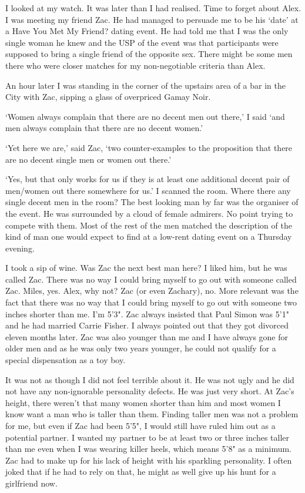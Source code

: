 I looked at my watch. It was later than I had realised. Time to
forget about Alex. I was meeting my friend Zac. He had managed to
persuade me to be his `date' at a Have You Met My Friend? dating
event. He had told me that
I was the only single woman he knew and the USP of the event was
that participants were supposed to bring a single friend of the
opposite sex. There might be some men there who were closer matches for my
non-negotiable criteria than Alex.

An hour later I was standing in the corner of the upstairs area of a
bar in the City with Zac, sipping a glass of overpriced Gamay Noir.

`Women always complain that there are no decent men out there,' I
said `and men always complain that there are no decent women.'

`Yet here we are,' said Zac, `two counter-examples to the
proposition that there are no decent single men or women out there.'

`Yes, but that only works for us if they is at least one additional
decent pair of men/women out there somewhere for us.' I scanned the
room. Where there any single decent men in the room? The best
looking man by far was the organiser of the event. He was surrounded
by a cloud of female admirers. No point trying to compete with them.
Most of the rest of the men matched the description of the kind of
man one would expect to find at a low-rent dating event on a Thursday
evening.

I took a sip of wine. Was Zac the next best man here? I liked him,
but he was called Zac. There was no way I could bring myself to go
out with someone called Zac. Miles, yes. Alex, why not? Zac (or even
Zachary), no. More relevant was the fact that there was no way that
I could bring myself to go out with someone two inches shorter than
me. I'm 5'3". Zac always insisted that Paul Simon was 5'1" and he
had married Carrie Fisher. I always pointed out that they got
divorced eleven months later. Zac was also younger than me and I have
always gone for older men and as he was only two years younger, he
could not qualify for a special dispensation as a toy boy.

It was not as though I did not feel terrible about it. He was not
ugly and he did not have any non-ignorable personality
defects. He was just very short. At Zac's height, there weren't that
many women shorter than him and most women I know want a man who is
taller than them. Finding taller men was not a problem for me, but
even if Zac had been 5'5", I would still have ruled him out as a
potential partner. I wanted my partner to be at least two or three
inches taller than me even when I was wearing killer heels, which
means 5'8" as a minimum. Zac had to make up for his lack of height
with his sparkling personality. I often joked that if he had to rely
on that, he might as well give up his hunt for a girlfriend now.

